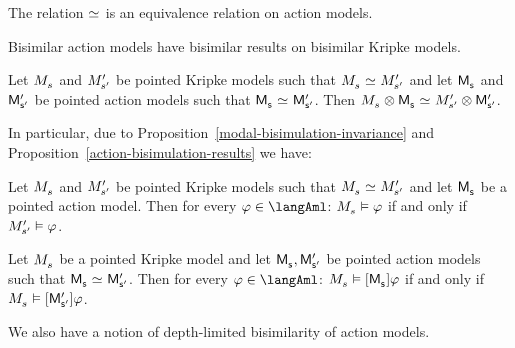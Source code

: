 \begin{proposition}
The relation $\bisimilar$ is an equivalence relation on action models.
\end{proposition}

Bisimilar action models have bisimilar results on bisimilar Kripke models.

\begin{proposition}\label{action-bisimulation-results}
Let $\kPModel{\kStateS}$ and ${M^{\prime}_{{{s}^{\prime}}}}$ be pointed Kripke models such that $\kPModel{\kStateS} \bisimilar \kPModelP{\kStateSP}$ and
let $\aPModel{\aStateS}$ and ${\mathsf{M}^{\prime}_{{\mathsf{{s}}^{\prime}}}}$ be pointed action models such that $\aPModel{\aStateS} \bisimilar \aPModelP{\aStateSP}$.
Then $\kPModel{\kStateS} \exec \aPModel{\aStateS} \bisimilar \kPModelP{\kStateSP} \exec \aPModelP{\aStateSP}$.
\end{proposition}

In particular, due to Proposition~\ref{modal-bisimulation-invariance} and Proposition~\ref{action-bisimulation-results} we have:

\begin{proposition}
Let $\kPModel{\kStateS}$ and ${M^{\prime}_{{{s}^{\prime}}}}$ be pointed Kripke models such that $\kPModel{\kStateS} \bisimilar \kPModelP{\kStateSP}$ and
let $\aPModel{\aStateS}$ be a pointed action model.
Then for every $\phi \in \langAml$: $\kPModel{\kStateS} \entails \phi$ if and only if ${M^{\prime}_{{{s}^{\prime}}}} \vDash \varphi$.
\end{proposition}

\begin{proposition}
Let $\kPModel{\kStateS}$ be a pointed Kripke model and
let $\aPModel{\aStateS}, \aPModelP{\aStateSP}$ be pointed action models such that $\aPModel{\aStateS} \bisimilar \aPModelP{\aStateSP}$.
Then for every $\phi \in \langAml$: $\kPModel{\kStateS} \entails \actionA{\aPModel{\aStateS}} \phi$ if and only if $\kPModel{\kStateS} \entails \actionA{\aPModelP{\aStateSP}} \phi$.
\end{proposition}

We also have a notion of depth-limited bisimilarity of action models.

